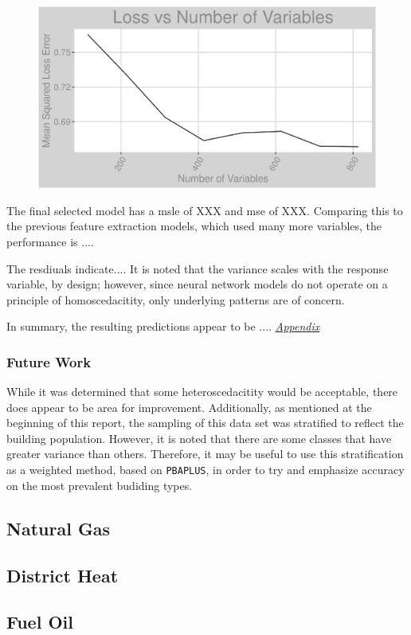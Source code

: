 \begin{figure}[h]
\centering
\includegraphics[width=\textwidth, height=0.4\textheight]{Images/electricity_nn_error.png}
\end{figure}

The final selected model has a msle of XXX and mse of XXX.  Comparing this to the previous feature extraction models, which used many more variables, the performance is ....

The resdiuals indicate.... It is noted that the variance scales with the response variable, by design; however, since neural network models do not operate on a principle of homoscedacitity, only underlying patterns are of concern.  

In summary, the resulting predictions appear to be ....  \textit{\hyperref[appendix:electricity:nn_full]{Appendix}}

\subsubsection{Future Work}
While it was determined that some heteroscedacitity would be acceptable, there does appear to be area for improvement.  Additionally, as mentioned at the beginning of this report, the sampling of this data set was stratified to reflect the building population.  However, it is noted that there are some classes that have greater variance than others.  Therefore, it may be useful to use this stratification as a weighted method, based on \lstinline{PBAPLUS}, in order to try and emphasize accuracy on the most prevalent budiding types. 

\FloatBarrier
\newpage
\subsection{Natural Gas}

\FloatBarrier
\newpage
\subsection{District Heat}

\FloatBarrier
\newpage
\subsection{Fuel Oil}